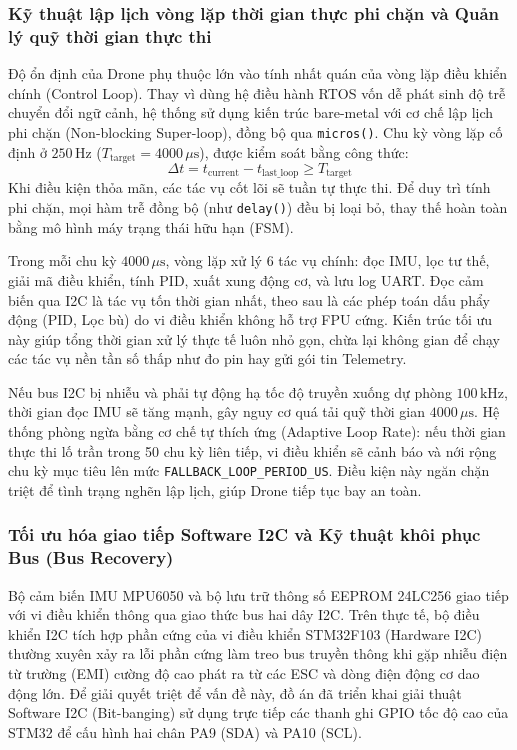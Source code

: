 \subsubsection{Kỹ thuật lập lịch vòng lặp thời gian thực phi chặn và Quản lý quỹ thời gian thực thi}

Độ ổn định của Drone phụ thuộc lớn vào tính nhất quán của vòng lặp điều khiển chính (Control Loop). Thay vì dùng hệ điều hành RTOS vốn dễ phát sinh độ trễ chuyển đổi ngữ cảnh, hệ thống sử dụng kiến trúc bare-metal với cơ chế lập lịch phi chặn (Non-blocking Super-loop), đồng bộ qua \texttt{micros()}. Chu kỳ vòng lặp cố định ở $250\,\text{Hz}$ ($T_{\text{target}} = 4000\,\mu\text{s}$), được kiểm soát bằng công thức:
\begin{equation}
\Delta t = t_{\text{current}} - t_{\text{last\_loop}} \ge T_{\text{target}}
\end{equation}
Khi điều kiện thỏa mãn, các tác vụ cốt lõi sẽ tuần tự thực thi. Để duy trì tính phi chặn, mọi hàm trễ đồng bộ (như \texttt{delay()}) đều bị loại bỏ, thay thế hoàn toàn bằng mô hình máy trạng thái hữu hạn (FSM).

Trong mỗi chu kỳ $4000\,\mu\text{s}$, vòng lặp xử lý 6 tác vụ chính: đọc IMU, lọc tư thế, giải mã điều khiển, tính PID, xuất xung động cơ, và lưu log UART. Đọc cảm biến qua I2C là tác vụ tốn thời gian nhất, theo sau là các phép toán dấu phẩy động (PID, Lọc bù) do vi điều khiển không hỗ trợ FPU cứng. Kiến trúc tối ưu này giúp tổng thời gian xử lý thực tế luôn nhỏ gọn, chừa lại không gian để chạy các tác vụ nền tần số thấp như đo pin hay gửi gói tin Telemetry.

Nếu bus I2C bị nhiễu và phải tự động hạ tốc độ truyền xuống dự phòng $100\,\text{kHz}$, thời gian đọc IMU sẽ tăng mạnh, gây nguy cơ quá tải quỹ thời gian $4000\,\mu\text{s}$. Hệ thống phòng ngừa bằng cơ chế tự thích ứng (Adaptive Loop Rate): nếu thời gian thực thi lố trần trong 50 chu kỳ liên tiếp, vi điều khiển sẽ cảnh báo và nới rộng chu kỳ mục tiêu lên mức \texttt{FALLBACK\_LOOP\_PERIOD\_US}. Điều kiện này ngăn chặn triệt để tình trạng nghẽn lập lịch, giúp Drone tiếp tục bay an toàn.

\subsubsection{Tối ưu hóa giao tiếp Software I2C và Kỹ thuật khôi phục Bus (Bus Recovery)}

Bộ cảm biến IMU MPU6050 và bộ lưu trữ thông số EEPROM 24LC256 giao tiếp với vi điều khiển thông qua giao thức bus hai dây I2C. Trên thực tế, bộ điều khiển I2C tích hợp phần cứng của vi điều khiển STM32F103 (Hardware I2C) thường xuyên xảy ra lỗi phần cứng làm treo bus truyền thông khi gặp nhiễu điện từ trường (EMI) cường độ cao phát ra từ các ESC và dòng điện động cơ dao động lớn. Để giải quyết triệt để vấn đề này, đồ án đã triển khai giải thuật Software I2C (Bit-banging) sử dụng trực tiếp các thanh ghi GPIO tốc độ cao của STM32 để cấu hình hai chân PA9 (SDA) và PA10 (SCL).

